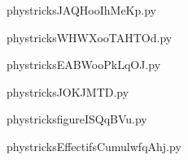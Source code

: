     \newcommand{\CaptionFigJAQHooIhMeKp}{<+Type your caption here+>}
    \begin{center}
        
    \end{center}
    phystricksJAQHooIhMeKp.py

    

    \clearpage
    


    \newcommand{\CaptionFigWHWXooTAHTOd}{<+Type your caption here+>}
    \begin{center}
        
    \end{center}
    phystricksWHWXooTAHTOd.py

    

    \clearpage
    


    \newcommand{\CaptionFigEABWooPkLqOJ}{<+Type your caption here+>}
    \begin{center}
        
    \end{center}
    phystricksEABWooPkLqOJ.py

    

    \clearpage
    


    \newcommand{\CaptionFigJOKJMTD}{<+Type your caption here+>}
    \begin{center}
        
    \end{center}
    phystricksJOKJMTD.py

    

    \clearpage
    


    \newcommand{\CaptionFigfigureISQqBVu}{<+Type your caption here+>}
    \begin{center}
        
    \end{center}
    phystricksfigureISQqBVu.py

    

    \clearpage
    


    \newcommand{\CaptionFigEffectifsCumulwfqAhj}{<+Type your caption here+>}
    \begin{center}
        
    \end{center}
    phystricksEffectifsCumulwfqAhj.py

